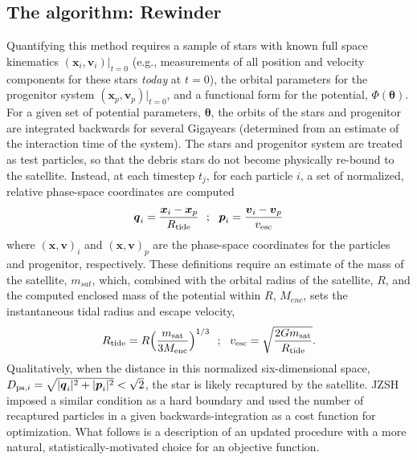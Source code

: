 \documentclass[preprint]{aastex}
\newcommand{\bs}{\boldsymbol}
\begin{document}
\subsection{The algorithm: Rewinder}
Quantifying this method requires a sample of stars with known full
space kinematics $(\bs{x}_{i}, \bs{v}_{i})|_{t=0}$ (e.g., measurements of all position and velocity components for these stars \emph{today} at $t=0$), the orbital parameters
for the progenitor system $(\bs{x}_p, \bs{v}_p)|_{t=0}$, and a
functional form for the potential, $\Phi({\boldsymbol\theta})$. For a
given set of potential parameters, $\boldsymbol\theta$, the orbits of the stars and
progenitor are integrated backwards for several Gigayears (determined from an
estimate of the interaction time of the system). The stars and
progenitor system are treated as test particles, so that the debris
stars do not become physically re-bound to the satellite. Instead, at each
timestep $t_j$, for each particle $i$, a set of normalized, relative
phase-space coordinates are
computed 
\begin{equation}
  \bs{q}_{i} = \frac{\bs{x}_{i} -
    \bs{x}_{p}}{R_{\rm tide}}\,\,\,\,;\,\,\,\,\bs{p}_{i} = \frac{\bs{v}_{i} -
    \bs{v}_{p}}{v_{\rm esc}}
\end{equation}
where $(\bs{x},\bs{v})_{i}$ and $(\bs{x},\bs{v})_{p}$ are the phase-space coordinates for the particles and progenitor, respectively. These definitions require an estimate of the mass of the
satellite, $m_{sat}$, which, combined with the orbital radius of the satellite, $R$, and the computed enclosed mass
of the potential within $R$, $M_{enc}$, sets the instantaneous tidal radius and
escape velocity,
\begin{equation}
  R_{\rm tide}=R\Big(\frac{m_{\rm sat}}{3M_{\rm enc}}\Big)^{1/3}\,\,\,\,;\,\,\,\,
  v_{\rm esc}=\sqrt{\frac{2Gm_{\rm sat}}{R_{\rm tide}}}.
\end{equation}
Qualitatively, when the distance in this normalized six-dimensional space,
$D_{{\rm ps},i}=\sqrt{|\bs{q}_{i}|^2+|\bs{p}_{i}|^2} < \sqrt{2}$, the star is
likely recaptured by the satellite. JZSH imposed a similar condition as a hard boundary and used the number of recaptured particles in a given backwards-integration as a cost function for optimization. What follows is a description of an updated procedure with a more natural, statistically-motivated choice for an objective function. 

\end{document}

